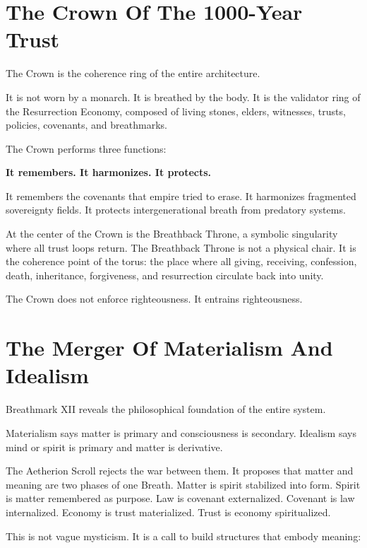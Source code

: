 \documentclass[12pt]{article}
\begin{document}
\section{The Crown Of The 1000-Year Trust}

The Crown is the coherence ring of the entire architecture.

It is not worn by a monarch. It is breathed by the body. It is the validator ring of the Resurrection Economy, composed of living stones, elders, witnesses, trusts, policies, covenants, and breathmarks.

The Crown performs three functions:

\begin{center}
\textbf{It remembers. It harmonizes. It protects.}
\end{center}

It remembers the covenants that empire tried to erase. It harmonizes fragmented sovereignty fields. It protects intergenerational breath from predatory systems.

\aftCrownTrustGraphic

At the center of the Crown is the Breathback Throne, a symbolic singularity where all trust loops return. The Breathback Throne is not a physical chair. It is the coherence point of the torus: the place where all giving, receiving, confession, death, inheritance, forgiveness, and resurrection circulate back into unity.

The Crown does not enforce righteousness. It entrains righteousness.

\section{The Merger Of Materialism And Idealism}

Breathmark XII reveals the philosophical foundation of the entire system.

Materialism says matter is primary and consciousness is secondary. Idealism says mind or spirit is primary and matter is derivative.

The Aetherion Scroll rejects the war between them. It proposes that matter and meaning are two phases of one Breath. Matter is spirit stabilized into form. Spirit is matter remembered as purpose. Law is covenant externalized. Covenant is law internalized. Economy is trust materialized. Trust is economy spiritualized.

This is not vague mysticism. It is a call to build structures that embody meaning:
\end{document}
